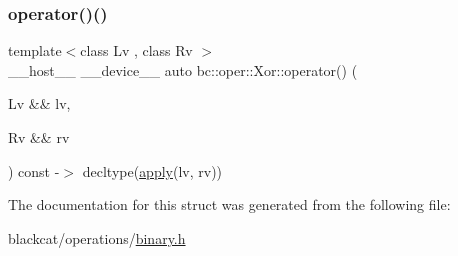 \mbox{\label{structbc_1_1oper_1_1Xor_a8e539de4f2934a9a45313a191d41b422}} 
\subsubsection{\texorpdfstring{operator()()}{operator()()}}
{\footnotesize\ttfamily template$<$class Lv , class Rv $>$ \\
\+\_\+\+\_\+host\+\_\+\+\_\+ \+\_\+\+\_\+device\+\_\+\+\_\+ auto bc\+::oper\+::\+Xor\+::operator() (\begin{DoxyParamCaption}\item[{Lv \&\&}]{lv,  }\item[{Rv \&\&}]{rv }\end{DoxyParamCaption}) const -\/$>$ decltype(\hyperlink{structbc_1_1oper_1_1Xor_a6af44f0d3ca3436078ca25332bba0bb2}{apply}(lv, rv)) \hspace{0.3cm}{\ttfamily [inline]}}



The documentation for this struct was generated from the following file\+:\begin{DoxyCompactItemize}
\item 
blackcat/operations/\hyperlink{binary_8h}{binary.\+h}\end{DoxyCompactItemize}
